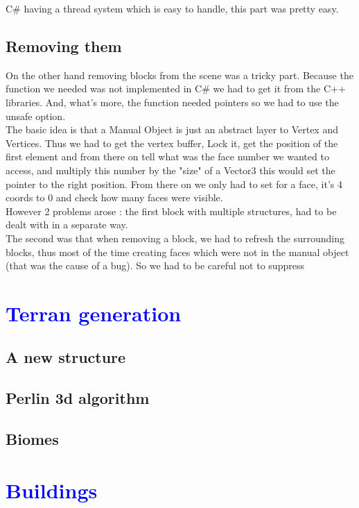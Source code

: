 \documentclass[article]{report}             %
\begin{document}
		C\# having a thread system which is easy to handle, this part was pretty easy.
				
			\section{Removing them}
				On the other hand removing blocks from the scene was a tricky part. Because the function we needed was not implemented in C\# we had to get it from the C++ libraries. And, what's more, the function needed pointers so we had to use the unsafe option.\\
The basic idea is that a Manual Object is just an abstract layer to Vertex and Vertices. Thus we had to get the vertex buffer, Lock it, get the position of the first element and from there on tell what was the face number we wanted to access, and multiply this number by the "size" of a Vector3 this would set the pointer to the right position. From there on we only had to set for a face, it's 4 coords to 0 and check how many faces were visible.\\

However 2 problems arose : the first block with multiple structures, had to be dealt with in a separate way. \\
The second was that when removing a block, we had to refresh the surrounding blocks, thus most of the time creating faces which were not in the manual object (that was the cause of a bug). So we had to be careful not to suppress 

		\chapter{\textcolor{blue}{Terran generation}}
			\section{A new structure}
				
			\section{Perlin 3d algorithm}
				
			\section{Biomes}
			
		\chapter{\textcolor{blue}{Buildings}}
\end{document}
